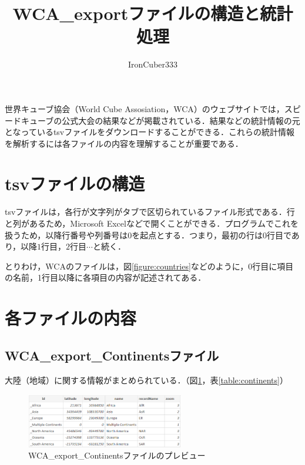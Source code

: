 \documentclass{article}
\title{WCA\_exportファイルの構造と統計処理}
\author{IronCuber333}
\date{}
\begin{document}
  \maketitle

  世界キューブ協会（World Cube Assosiation，WCA）のウェブサイトでは，スピードキューブの公式大会の結果などが掲載されている．結果などの統計情報の元となっているtsvファイルをダウンロードすることができる．これらの統計情報を解析するには各ファイルの内容を理解することが重要である．\par

  \section{tsvファイルの構造}

  tsvファイルは，各行が文字列がタブで区切られているファイル形式である．行と列があるため，Microsoft Excelなどで開くことができる．プログラムでこれを扱うため，以降行番号や列番号は$ 0 $を起点とする．つまり，最初の行は$ 0 $行目であり，以降$ 1 $行目，$ 2 $行目$ \cdots $と続く．\par
  とりわけ，WCAのファイルは，図\ref{figure:countries}などのように，0行目に項目の名前，1行目以降に各項目の内容が記述されてある．\par

  \section{各ファイルの内容}

  \subsection{WCA\_export\_Continentsファイル}

  大陸（地域）に関する情報がまとめられている．（図\ref{figure:continents}，表\ref{table:continents}）\par

  \begin{figure}[h]
    \centering
    \includegraphics[height=24mm]{continents.png}
    \caption{WCA\_export\_Continentsファイルのプレビュー}
    \label{figure:continents}
  \end{figure}
\end{document}
